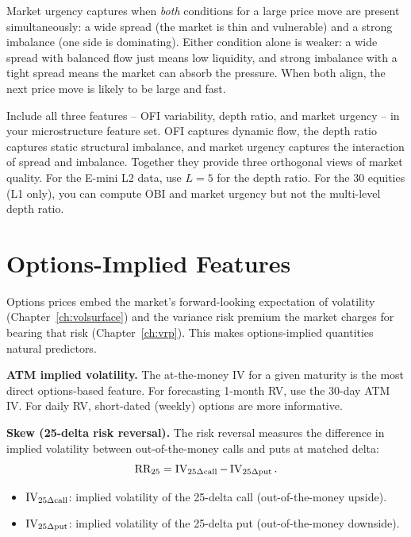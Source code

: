 \begin{intuition}
Market urgency captures when \emph{both} conditions for a large price move are present simultaneously: a wide spread (the market is thin and vulnerable) and a strong imbalance (one side is dominating).
Either condition alone is weaker: a wide spread with balanced flow just means low liquidity, and strong imbalance with a tight spread means the market can absorb the pressure.
When both align, the next price move is likely to be large and fast.
\end{intuition}

\begin{projectconnection}
Include all three features -- OFI variability, depth ratio, and market urgency -- in your microstructure feature set.
OFI captures dynamic flow, the depth ratio captures static structural imbalance, and market urgency captures the interaction of spread and imbalance.
Together they provide three orthogonal views of market quality.
For the E-mini L2 data, use $L = 5$ for the depth ratio.
For the 30 equities (L1 only), you can compute OBI and market urgency but not the multi-level depth ratio.
\end{projectconnection}

\section{Options-Implied Features}\label{sec:feat-options}

Options prices embed the market's forward-looking expectation of volatility (Chapter~\ref{ch:volsurface}) and the variance risk premium the market charges for bearing that risk (Chapter~\ref{ch:vrp}).
This makes options-implied quantities natural predictors.

\textbf{ATM implied volatility.}
The at-the-money IV for a given maturity is the most direct options-based feature.
For forecasting 1-month RV, use the 30-day ATM IV.
For daily RV, short-dated (weekly) options are more informative.

\textbf{Skew (25-delta risk reversal).}
The risk reversal measures the difference in implied volatility between out-of-the-money calls and puts at matched delta:
\begin{equation}\label{eq:rr}
\text{RR}_{25} = \operatorname{IV}_{25\Delta\text{call}} - \operatorname{IV}_{25\Delta\text{put}}.
\end{equation}
\begin{itemize}[nosep]
  \item $\operatorname{IV}_{25\Delta\text{call}}$: implied volatility of the 25-delta call (out-of-the-money upside).
  \item $\operatorname{IV}_{25\Delta\text{put}}$: implied volatility of the 25-delta put (out-of-the-money downside).
\end{itemize}

